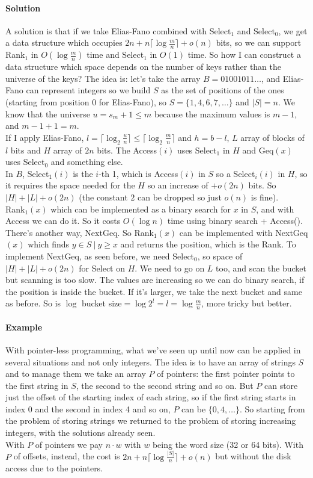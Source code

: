 \documentclass[10pt]{report}
\begin{document}
\paragraph{Solution} A solution is that if we take Elias-Fano combined with Select$_1$ and Select$_0$, we get a data structure which occupies $2n + n \lceil \log \frac{m}{n}\rceil+o(n)$ bits, so we can support Rank$_1$ in $O(\log\frac{m}{n})$ time and Select$_1$ in $O(1)$ time.
So how I can construct a data structure which space depends on the number of keys rather than the universe of the keys? The idea is: let's take the array $B = 01001011\ldots$, and Elias-Fano can represent integers so we build $S$ as the set of positions of the ones (starting from position $0$ for Elias-Fano), so $S=\{1,4,6,7,\ldots\}$ and $|S|=n$. We know that the universe $u = s_m + 1 \leq m$ because the maximum values is $m-1$, and $m-1+1=m$.\\
If I apply Elias-Fano, $l=\lceil\log_2\frac{u}{n}\rceil \leq \lceil\log_2\frac{m}{n}\rceil$ and $h = b - l$, $L$ array of blocks of $l$ bits and $H$ array of $2n$ bits. The Access$(i)$ uses Select$_1$ in $H$ and Geq$(x)$ uses Select$_0$ and something else.\\
In $B$, Select$_1(i)$ is the $i$-th 1, which is Access$(i)$ in $S$ so a Select$_i(i)$ in $H$, so it requires the space needed for the $H$ so an increase of $+o(2n)$ bits. So $|H|+|L| + o(2n)$ (the constant $2$ can be dropped so just $o(n)$ is fine).\\
Rank$_1(x)$ which can be implemented as a binary search for $x$ in $S$, and with Access we can do it. So it costs $O(\log n)$ time using binary search + Access(). There's another way, NextGeq. So Rank$_1(x)$ can be implemented with NextGeq$(x)$ which finds $y\in S\:|\:y\geq x$ and returns the position, which is the Rank. To implement NextGeq, as seen before, we need Select$_0$, so space of $|H|+|L|+o(2n)$ for Select on $H$. We need to go on $L$ too, and scan the bucket but scanning is too slow. The values are increasing so we can do binary search, if the position is inside the bucket. If it's larger, we take the next bucket and same as before. So is $\log$ bucket size$=\log 2^l = l = \log\frac{m}{n}$, more tricky but better.
\paragraph{Example} With pointer-less programming, what we've seen up until now can be applied in several situations and not only integers. The idea is to have an array of strings $S$ and to manage them we take an array $P$ of pointers: the first pointer points to the first string in $S$, the second to the second string and so on. But $P$ can store just the offset of the starting index of each string, so if the first string starts in index 0 and the second in index 4 and so on, $P$ can be $\{0,4,\ldots\}$. So starting from the problem of storing strings we returned to the problem of storing increasing integers, with the solutions already seen.\\
With $P$ of pointers we pay $n\cdot w$ with $w$ being the word size (32 or 64 bits). With $P$ of offsets, instead, the cost is $2n+n\lceil\log\frac{|S|}{n}\rceil+o(n)$ but without the disk access due to the pointers.
\end{document}
